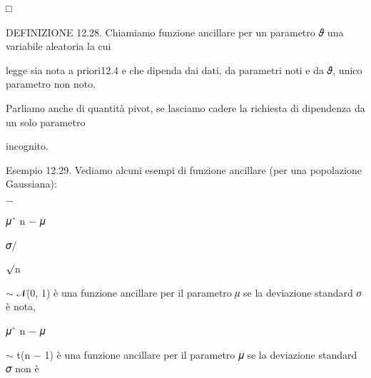 \documentclass[a4paper,portrait,12pt]{article}
\begin{document}
□


\begin{flushleft}
DEFINIZIONE 12.28. Chiamiamo funzione ancillare per un parametro 𝜗 una variabile aleatoria la cui
\end{flushleft}


\begin{flushleft}
legge sia nota a priori12.4 e che dipenda dai dati, da parametri noti e da 𝜗, unico parametro non noto.
\end{flushleft}


\begin{flushleft}
Parliamo anche di quantit\`{a} pivot, se lasciamo cadere la richiesta di dipendenza da un solo parametro
\end{flushleft}


\begin{flushleft}
incognito.
\end{flushleft}


\begin{flushleft}
Esempio 12.29. Vediamo alcuni esempi di funzione ancillare (per una popolazione Gaussiana):
\end{flushleft}


$-$





\begin{flushleft}
𝜇ˆ n $-$ 𝜇
\end{flushleft}


\begin{flushleft}
𝜎/
\end{flushleft}


\begin{flushleft}
$\surd$n
\end{flushleft}





\begin{flushleft}
$\sim$ 𝒩(0, 1) \`{e} una funzione ancillare per il parametro 𝜇 se la deviazione standard 𝜎 \`{e} nota,
\end{flushleft}





\begin{flushleft}
𝜇ˆ n $-$ 𝜇
\end{flushleft}





\begin{flushleft}
$\sim$ t(n $-$ 1) \`{e} una funzione ancillare per il parametro 𝜇 se la deviazione standard 𝜎 non \`{e}
\end{flushleft}
\end{document}
